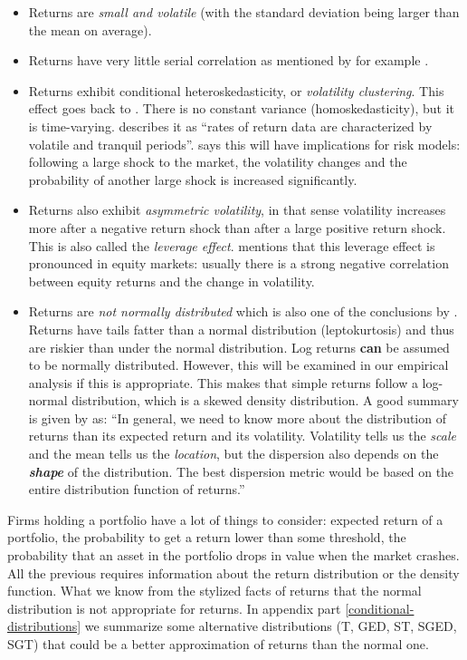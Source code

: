 \documentclass[a4paper, twoside]{templates/ociamthesis}
\providecommand{\tightlist}{%
  \setlength{\itemsep}{0pt}\setlength{\parskip}{0pt}}
\begin{document}
\begin{itemize}
\tightlist
\item
  Returns are \emph{small and volatile} (with the standard deviation being larger than the mean on average).
\item
  Returns have very little serial correlation as mentioned by for example \textcite{bollerslev1987}.
\item
  Returns exhibit conditional heteroskedasticity, or \emph{volatility clustering}. This effect goes back to \textcite{mandelbrot1963}. There is no constant variance (homoskedasticity), but it is time-varying. \textcite{bollerslev1987} describes it as ``rates of return data are characterized by volatile and tranquil periods''. \textcite{alexander2008} says this will have implications for risk models: following a large shock to the market, the volatility changes and the probability of another large shock is increased significantly.
\item
  Returns also exhibit \emph{asymmetric volatility}, in that sense volatility increases more after a negative return shock than after a large positive return shock. This is also called the \emph{leverage effect}. \textcite{alexander2008} mentions that this leverage effect is pronounced in equity markets: usually there is a strong negative correlation between equity returns and the change in volatility.
\item
  Returns are \emph{not normally distributed} which is also one of the conclusions by \textcite{fama1965}. Returns have tails fatter than a normal distribution (leptokurtosis) and thus are riskier than under the normal distribution. Log returns \textbf{can} be assumed to be normally distributed. However, this will be examined in our empirical analysis if this is appropriate. This makes that simple returns follow a log-normal distribution, which is a skewed density distribution. A good summary is given by \textcite{alexander2008} as: ``In general, we need to know more about the distribution of returns than its expected return and its volatility. Volatility tells us the \emph{scale} and the mean tells us the \emph{location}, but the dispersion also depends on the \textbf{\emph{shape}} of the distribution. The best dispersion metric would be based on the entire distribution function of returns.''
\end{itemize}

\noindent Firms holding a portfolio have a lot of things to consider: expected return of a portfolio, the probability to get a return lower than some threshold, the probability that an asset in the portfolio drops in value when the market crashes. All the previous requires information about the return distribution or the density function. What we know from the stylized facts of returns that the normal distribution is not appropriate for returns. In appendix part \ref{conditional-distributions} we summarize some alternative distributions (T, GED, ST, SGED, SGT) that could be a better approximation of returns than the normal one.
\end{document}
